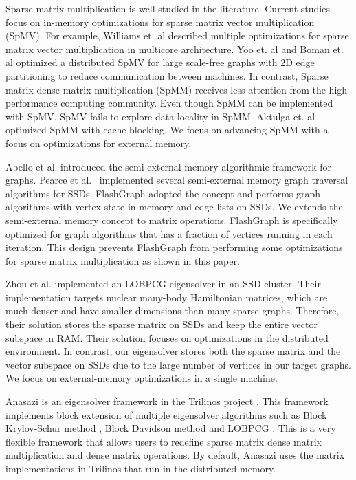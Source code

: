 Sparse matrix multiplication is well studied in the literature. Current studies
focus on in-memory optimizations for sparse matrix vector multiplication (SpMV).
For example,
Williams et. al \cite{Williams07} described multiple optimizations for sparse matrix
vector multiplication in multicore architecture. Yoo et. al \cite{Yoo11}
and Boman et. al \cite{Boman2013} optimized a distributed SpMV for large
scale-free graphs with 2D edge partitioning to reduce communication between
machines. In contrast, Sparse matrix dense matrix multiplication (SpMM) receives
less attention from the high-performance computing community. Even though
SpMM can be implemented with SpMV, SpMV fails to explore data locality in SpMM.
Aktulga et. al \cite{Aktulga14} optimized SpMM with cache blocking. We focus on
advancing SpMM with a focus on optimizations for external memory.

Abello et al. \cite{Abello98} introduced the semi-external memory algorithmic
framework for graphs.  Pearce et al.~\cite{Pearce10} implemented several 
semi-external memory graph traversal algorithms for SSDs. FlashGraph
\cite{flashgraph} adopted the concept and performs graph algorithms with
vertex state in memory and edge lists on SSDs. We extends the semi-external
memory concept to matrix operations. FlashGraph is specifically optimized for
graph algorithms that has a fraction of vertices running in each iteration.
This design prevents FlashGraph from performing some optimizations for sparse
matrix multiplication as shown in this paper.

Zhou et al. \cite{Zhou12} implemented an LOBPCG \cite{Arbenz05} eigensolver in
an SSD cluster. Their implementation targets nuclear many-body Hamiltonian
matrices, which are much denser and have smaller dimensions than many sparse
graphs. Therefore, their solution stores the sparse matrix on SSDs and keep
the entire vector subspace in RAM. Their solution focuses on optimizations
in the distributed environment. In contrast, our eigensolver stores both
the sparse matrix and the vector subspace on SSDs due to the large number
of vertices in our target graphs. We focus on external-memory optimizations
in a single machine.

Anasazi \cite{anasazi} is an eigensolver framework in the Trilinos project
\cite{trilinos}. This framework implements block extension of multiple
eigensolver algorithms
such as Block Krylov-Schur method \cite{krylovschur}, Block Davidson method
\cite{Arbenz05} and LOBPCG \cite{Arbenz05}. This is a very flexible framework
that allows users to redefine sparse matrix dense matrix multiplication and
dense matrix operations. By default, Anasazi uses the matrix implementations
in Trilinos that run in the distributed memory.
